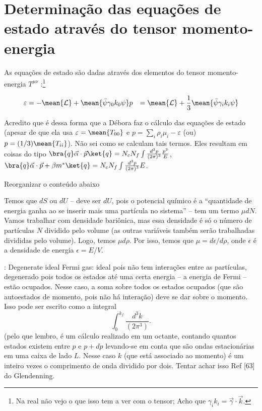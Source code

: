 \section{Determinação das equações de estado através do tensor momento-energia}

As equações de estado são dadas através dos elementos do tensor momento-energia $T^{\mu\nu}$ \parencite{Glendenning, Glendenning1983}:\footnote{Na real não vejo o que isso tem a ver com o tensor; Acho que $\gamma_ik_i = \vec{\gamma}\cdot\vec{k}$.}

\begin{align}
	\varepsilon &= -\mean{\mathcal{L}} + \mean{\bar\psi\gamma_0k_0\psi}
	p &= \mean{\mathcal{L}} + \frac{1}{3} \mean{\bar\psi\gamma_ik_i\psi}
\end{align}

Acredito que é dessa forma que a Débora faz o cálculo das equações de estado (apesar de que ela usa $\varepsilon = \mean{T_{00}}$ e $p = \sum_i \rho_i \mu_i - \varepsilon$ (ou) $p = (1/3) \mean{T_{ii}}$). Não sei como se calculam tais termos. Eles resultam em coisas do tipo $\bra{q}\vec{\alpha}\cdot\vec{p}\ket{q} = N_c N_f \int \frac{d^3p}{(2\pi)^3}\frac{p^2}{E}$, $\bra{q}\vec{\alpha}\cdot\vec{p} + \beta m^*\ket{q} = N_c N_f \int \frac{d^3p}{(2\pi)^3}E$.



Reorganizar o conteúdo abaixo

Temos que $dS$ ou $dU$ -- deve ser $dU$, pois o potencial químico é a ``quantidade de energia ganha ao se inserir mais uma partícula no sistema'' -- tem um termo $\mu dN$. Vamos trabalhar com densidade bariônica, mas essa densidade é só o número de partículas $N$ dividido pelo volume (as outras variáveis também serão trabalhadas divididas pelo volume). Logo, temos $\mu d\rho$. Por isso, temos que $\mu = d\epsilon/d\rho$, onde $\epsilon$ é a densidade de energia $\epsilon = E/V$. 

\textcite{Glendenning}:
Degenerate ideal Fermi gas: ideal pois não tem interações entre as partículas, degenerado pois todos os estados até uma certa energia -- a energia de Fermi -- estão ocupados. Nesse caso, a soma sobre todos os estados ocupados (que são autoestados de momento, pois não há interação) deve se dar sobre o momento. Isso pode ser escrito como a integral
\begin{equation}
	\int_0^{k_f} \frac{d^3k}{(2\pi^3)}.
\end{equation}
%
(pelo que lembro, é um cálculo realizado em um octante, contando quantos estados existem entre $p$ e $p+dp$ levando-se em conta que são ondas estacionárias em uma caixa de lado $L$. Nesse caso $k$ (que está associado ao momento) é um inteiro vezes o comprimento de onda dividido por dois. Tentar achar isso Ref [63] do Glendenning.

